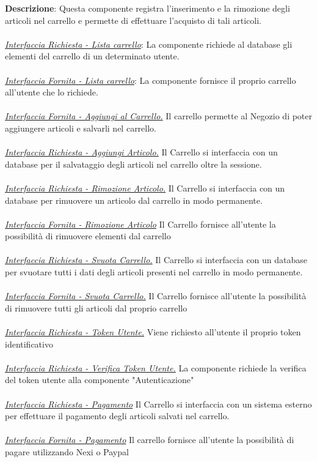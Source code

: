 \documentclass{report}
\begin{document}
\textbf{Descrizione}: Questa componente registra l'inserimento e la rimozione degli articoli nel carrello e permette di effettuare l'acquisto di tali articoli. \\ \\
\uline{\textit{Interfaccia Richiesta - Lista carrello}}:
La componente richiede al database gli elementi del carrello di un determinato utente. \\\\
\uline{\textit{Interfaccia Fornita - Lista carrello}}:
La componente fornisce il proprio carrello all'utente che lo richiede.\\\\
\uline{\textit{Interfaccia Fornita - Aggiungi al Carrello.}} 
Il carrello permette al Negozio di poter aggiungere articoli e salvarli nel carrello.\\ \\
\uline{\textit{Interfaccia Richiesta - Aggiungi Articolo.}} 
Il Carrello si interfaccia con un database per il salvataggio degli articoli nel carrello oltre la sessione.\\ \\
\uline{\textit{Interfaccia Richiesta - Rimozione Articolo.}} 
Il Carrello si interfaccia con un database per rimuovere un articolo dal carrello in modo permanente.\\ \\
\uline{\textit{Interfaccia Fornita - Rimozione Articolo}}
Il Carrello fornisce all'utente la possibilità di rimuovere elementi dal carrello\\\\
\uline{\textit{Interfaccia Richiesta - Svuota Carrello.}}
Il Carrello si interfaccia con un database per svuotare tutti i dati degli articoli presenti nel carrello in modo permanente.\\ \\
\uline{\textit{Interfaccia Fornita - Svuota Carrello.}}
Il Carrello fornisce all'utente la possibilità di rimuovere tutti gli articoli dal proprio carrello\\ \\
\uline{\textit{Interfaccia Richiesta - Token Utente.}} 
Viene richiesto all'utente il proprio token identificativo\\ \\
\uline{\textit{Interfaccia Richiesta - Verifica Token Utente.}} 
La componente richiede la verifica del token utente alla componente "Autenticazione"\\\\
\uline{\textit{Interfaccia Richiesta - Pagamento}}
Il Carrello si interfaccia con un sistema esterno per effettuare il pagamento degli articoli salvati nel carrello.\\\\
\uline{\textit{Interfaccia Fornita - Pagamento}}
Il carrello fornisce all'utente la possibilità di pagare utilizzando Nexi o Paypal
\end{document}
